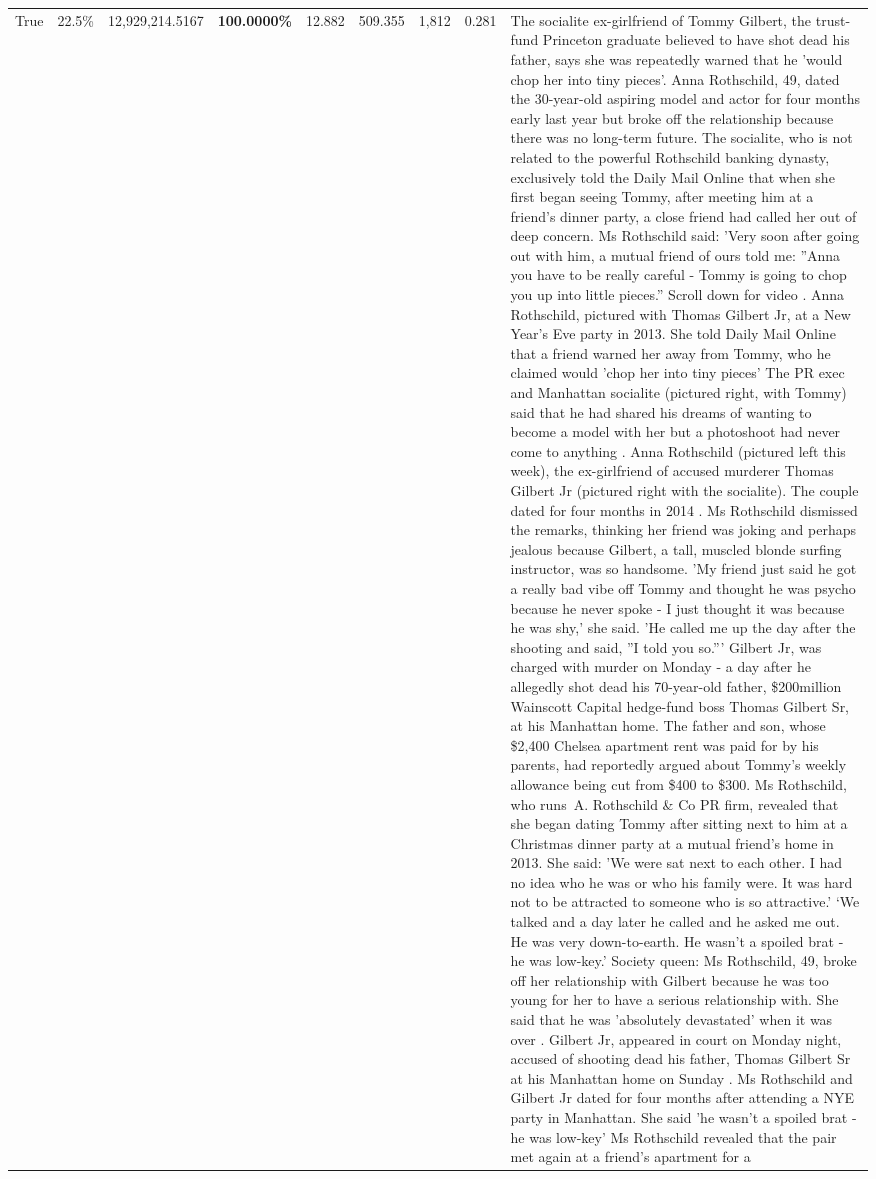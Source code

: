 \begin{table}[H]
\begin{tabular}{lllrlllll}
True & 22.5\% & 12,929,214.5167 & \bfseries \color{red} 100.0000\% & 12.882 & 509.355 & 1,812 & 0.281 & The socialite ex-girlfriend of Tommy Gilbert, the trust-fund Princeton graduate believed to have shot dead his father, says she was repeatedly warned that he 'would chop her into tiny pieces'. Anna Rothschild, 49, dated the 30-year-old aspiring model and actor for four months early last year but broke off the relationship because there was no long-term future. The socialite, who is not related to the powerful Rothschild banking dynasty, exclusively told the Daily Mail Online that when she first began seeing Tommy, after meeting him at a friend's dinner party, a close friend had called her out of deep concern. Ms Rothschild said: 'Very soon after going out with him, a mutual friend of ours told me: ''Anna you have to be really careful - Tommy is going to chop you up into little pieces.'' Scroll down for video . Anna Rothschild, pictured with Thomas Gilbert Jr, at a New Year's Eve party in 2013. She told Daily Mail Online that a friend warned her away from Tommy, who he claimed would 'chop her into tiny pieces' The PR exec and Manhattan socialite (pictured right, with Tommy) said that he had shared his dreams of wanting to become a model with her but a photoshoot had never come to anything . Anna Rothschild (pictured left this week), the ex-girlfriend of accused murderer Thomas Gilbert Jr (pictured right with the socialite). The couple dated for four months in 2014 . Ms Rothschild dismissed the remarks, thinking her friend was joking and perhaps jealous because Gilbert, a tall, muscled blonde surfing instructor, was so handsome. 'My friend just said he got a really bad vibe off Tommy and thought he was psycho because he never spoke - I just thought it was because he was shy,' she said. 'He called me up the day after the shooting and said, ''I told you so.''' Gilbert Jr, was charged with murder on Monday - a day after he allegedly shot dead his 70-year-old father, \$200million Wainscott Capital hedge-fund boss Thomas Gilbert Sr, at his Manhattan home. The father and son, whose \$2,400 Chelsea apartment rent was paid for by his parents, had reportedly argued about Tommy's weekly allowance being cut from \$400 to \$300. Ms Rothschild, who runs A. Rothschild \& Co PR firm, revealed that she began dating Tommy after sitting next to him at a Christmas dinner party at a mutual friend's home in 2013. She said: 'We were sat next to each other. I had no idea who he was or who his family were. It was hard not to be attracted to someone who is so attractive.' ‘We talked and a day later he called and he asked me out. He was very down-to-earth. He wasn’t a spoiled brat - he was low-key.’ Society queen: Ms Rothschild, 49, broke off her relationship with Gilbert because he was too young for her to have a serious relationship with. She said that he was 'absolutely devastated' when it was over . Gilbert Jr, appeared in court on Monday night, accused of shooting dead his father, Thomas Gilbert Sr at his Manhattan home on Sunday . Ms Rothschild and Gilbert Jr dated for four months after attending a NYE party in Manhattan. She said 'he wasn't a spoiled brat - he was low-key' Ms Rothschild revealed that the pair met again at a friend’s apartment for a 
\end{tabular}
\end{table}
